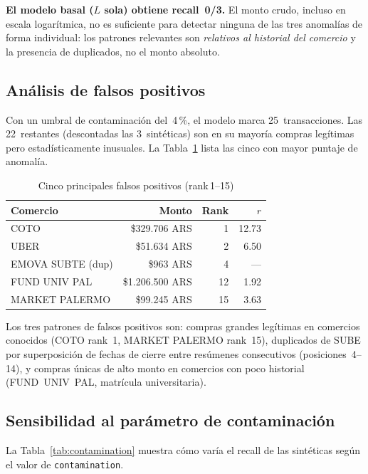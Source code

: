 \documentclass[conference]{IEEEtran}
\begin{document}
\textbf{El modelo basal ($L$ sola) obtiene recall~0/3.}
El monto crudo, incluso en escala logar\'itmica, no es suficiente para detectar
ninguna de las tres anomal\'ias de forma individual: los patrones relevantes son
\emph{relativos al historial del comercio} y la presencia de duplicados, no el
monto absoluto.

\subsection{An\'alisis de falsos positivos}

Con un umbral de contaminaci\'on del~4\,\%, el modelo marca 25~transacciones. Las
22~restantes (descontadas las 3~sint\'eticas) son en su mayor\'ia compras leg\'itimas
pero estad\'isticamente inusuales. La Tabla~\ref{tab:false-positives} lista las cinco
con mayor puntaje de anomal\'ia.

\begin{table}[h]
\caption{Cinco principales falsos positivos (rank\,1--15)}
\label{tab:false-positives}
\centering
\begin{tabular}{p{2.0cm}rrr}
\toprule
\textbf{Comercio} & \textbf{Monto} & \textbf{Rank} & \textbf{$r$} \\
\midrule
COTO             & \$329.706 ARS & 1  & 12.73 \\
UBER             & \$51.634 ARS  & 2  & 6.50  \\
EMOVA SUBTE (dup) & \$963 ARS   & 4  & --- \\
FUND UNIV PAL    & \$1.206.500 ARS & 12 & 1.92 \\
MARKET PALERMO   & \$99.245 ARS  & 15 & 3.63 \\
\bottomrule
\end{tabular}
\end{table}

Los tres patrones de falsos positivos son: compras grandes leg\'itimas en comercios
conocidos (COTO rank~1, MARKET PALERMO rank~15), duplicados de SUBE por superposici\'on
de fechas de cierre entre res\'umenes consecutivos (posiciones~4--14), y compras
\'unicas de alto monto en comercios con poco historial (FUND~UNIV~PAL, matr\'icula
universitaria).

\subsection{Sensibilidad al par\'ametro de contaminaci\'on}

La Tabla~\ref{tab:contamination} muestra c\'omo var\'ia el recall de las sint\'eticas
seg\'un el valor de \texttt{contamination}.
\end{document}
